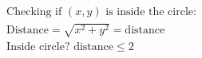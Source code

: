 \documentclass[preview]{standalone}
\begin{document}
\begin{align*}
\text{Checking if } (x, y) \text{ is inside the circle:}\\ \text{Distance} = \sqrt{x^2 + y^2} = \text{distance}\\ \text{Inside circle? } \text{distance} \leq 2
\end{align*}
\end{document}
